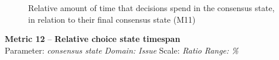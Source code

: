 \documentclass[article]{elsarticle}
\begin{document}
\begin{figure}
\begin{center}

  \caption{Relative amount of time that decisions spend in the consensus state, in relation to their final consensus state (M11)}
  \label{fig:M11}
  \end{center}
\end{figure}

\vspace{1em}
\noindent
\textbf{Metric 12} -- \textbf{Relative choice state timespan}\\
Parameter: \emph{consensus state} \emph{Domain: Issue} Scale: \emph{Ratio} \emph{Range: \%}\\
\end{document}
